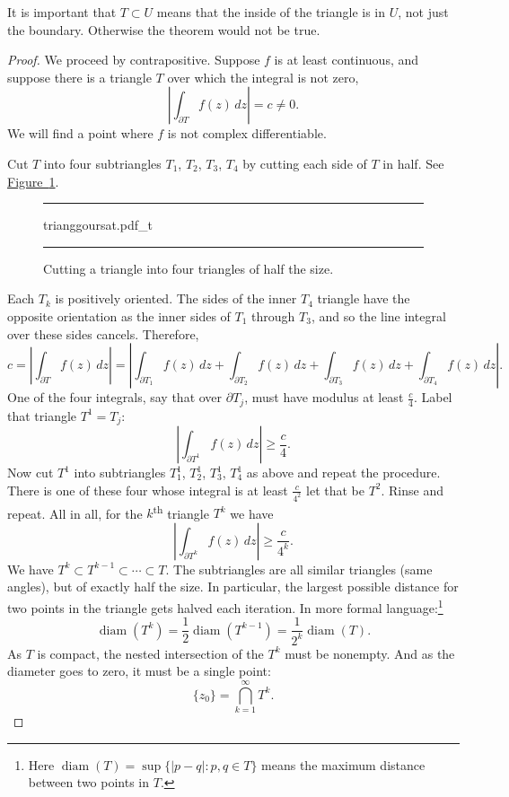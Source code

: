 \documentclass[12pt,openany]{book}
\newcommand{\sabs}[1]{\lvert {#1} \rvert}
\newcommand{\abs}[1]{\left\lvert {#1} \right\rvert}
\theoremstyle{plain}
\theoremstyle{remark}
\theoremstyle{definition}
\newenvironment{myfig}{%
\begin{figure}[h!t]
\noindent\rule{\textwidth}{0.4pt}\vspace{12pt}\par\centering}%
{\par\noindent\rule{\textwidth}{0.4pt}
\end{figure}}
\theoremstyle{exercise}
\theoremstyle{example}
\newcommand{\figureref}[1]{\hyperref[#1]{Figure~\ref*{#1}}}
\begin{document}
It is important that $T \subset U$ means that the inside
of the triangle is in $U$, not just the boundary.  Otherwise the theorem
would not be true.

\begin{proof}
We proceed by contrapositive.
Suppose $f$ is at least continuous, and 
suppose there is a triangle $T$ over which the integral is not zero,
\begin{equation*}
\abs{\int_{\partial T} f(z) \, dz} = c \not= 0 .
\end{equation*}
We will find a point
where $f$ is not complex differentiable.

Cut $T$ into four subtriangles
$T_1$, $T_2$, $T_3$, $T_4$ by cutting each side of $T$ in half.  See
\figureref{fig:trianggoursat}.
\begin{myfig}
{trianggoursat.pdf_t}
\caption{Cutting a triangle into four triangles of half the size.%
\label{fig:trianggoursat}}
\end{myfig}

Each $T_k$ is positively oriented.
The sides of the inner $T_4$ triangle have the opposite
orientation as the inner sides of $T_1$ through $T_3$, and
so the line integral over these sides cancels.  Therefore,
\begin{equation*}
c = 
\abs{\int_{\partial T} f(z) \, dz }
=
\abs{\int_{\partial T_1} f(z) \, dz 
+
\int_{\partial T_2} f(z) \, dz 
+
\int_{\partial T_3} f(z) \, dz 
+
\int_{\partial T_4} f(z) \, dz } .
\end{equation*}
One of the four integrals, say that over $\partial T_j$,
must have modulus at least $\frac{c}{4}$.  Label
that triangle $T^1 = T_j$:
\begin{equation*}
\abs{\int_{\partial T^1} f(z) \, dz } \geq \frac{c}{4} .
\end{equation*}
Now cut $T^1$ into subtriangles
$T_1^1$, $T_2^1$, $T_3^1$, $T_4^1$ as above and repeat the procedure.  There
is one of these four whose integral is at least $\frac{c}{4^2}$ let that be
$T^2$.  Rinse and repeat.
All in all, for the $k$\textsuperscript{th} triangle $T^k$ we have
\begin{equation*}
\abs{\int_{\partial T^k} f(z) \, dz } \geq \frac{c}{4^k} .
\end{equation*}
We have $T^k \subset T^{k-1} \subset \cdots \subset T$.
The subtriangles are all similar triangles (same angles),
but of exactly half the size.
In particular,
the largest possible distance for two points in the triangle 
gets halved each iteration.
In more formal language:\footnote{%
Here $\operatorname{diam}(T)= \sup \{ \sabs{p-q} : p,q \in T \}$
means the maximum distance between two points in $T$.}
\begin{equation*}
\operatorname{diam}(T^k) =
\frac{1}{2} \operatorname{diam}(T^{k-1})
=
\frac{1}{2^k} \operatorname{diam}(T) .
\end{equation*}
As $T$ is compact, the nested intersection of the $T^k$ must be nonempty.
And as the diameter goes to zero, it must be a single point:
\begin{equation*}
\{ z_0 \} = \bigcap_{k=1}^\infty T^k .
\end{equation*}


\end{proof}
\end{document}
